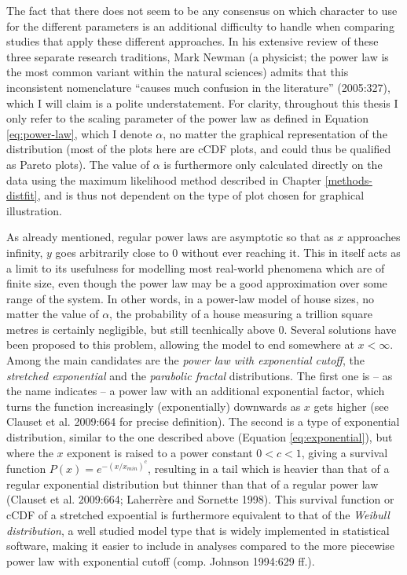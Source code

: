 \documentclass[
  12pt,
]{book}
\begin{document}
The fact that there does not seem to be any consensus on which character to use for the different parameters is an additional difficulty to handle when comparing studies that apply these different approaches. In his extensive review of these three separate research traditions, Mark Newman (a physicist; the power law is the most common variant within the natural sciences) admits that this inconsistent nomenclature ``causes much confusion in the literature'' (2005:327), which I will claim is a polite understatement. For clarity, throughout this thesis I only refer to the scaling parameter of the power law as defined in Equation \eqref{eq:power-law}, which I denote \(\alpha\), no matter the graphical representation of the distribution (most of the plots here are cCDF plots, and could thus be qualified as Pareto plots). The value of \(\alpha\) is furthermore only calculated directly on the data using the maximum likelihood method described in Chapter \ref{methods-distfit}, and is thus not dependent on the type of plot chosen for graphical illustration.

As already mentioned, regular power laws are asymptotic so that as \(x\) approaches infinity, \(y\) goes arbitrarily close to \(0\) without ever reaching it. This in itself acts as a limit to its usefulness for modelling most real-world phenomena which are of finite size, even though the power law may be a good approximation over some range of the system. In other words, in a power-law model of house sizes, no matter the value of \(\alpha\), the probability of a house measuring a trillion square metres is certainly negligible, but still tecnhically above \(0\). Several solutions have been proposed to this problem, allowing the model to end somewhere at \(x < \infty\). Among the main candidates are the \emph{power law with exponential cutoff}, the \emph{stretched exponential} and the \emph{parabolic fractal} distributions. The first one is -- as the name indicates -- a power law with an additional exponential factor, which turns the function increasingly (exponentially) downwards as \(x\) gets higher (see Clauset et al. 2009:664 for precise definition). The second is a type of exponential distribution, similar to the one described above (Equation \eqref{eq:exponential}), but where the \(x\) exponent is raised to a power constant \(0 < c <1\), giving a survival function \(P(x) = e^{-(x/x_{min})^c}\), resulting in a tail which is heavier than that of a regular exponential distribution but thinner than that of a regular power law (Clauset et al. 2009:664; Laherrère and Sornette 1998). This survival function or cCDF of a stretched expoential is furthermore equivalent to that of the \emph{Weibull distribution}, a well studied model type that is widely implemented in statistical software, making it easier to include in analyses compared to the more piecewise power law with exponential cutoff (comp. Johnson 1994:629 ff.).
\end{document}
